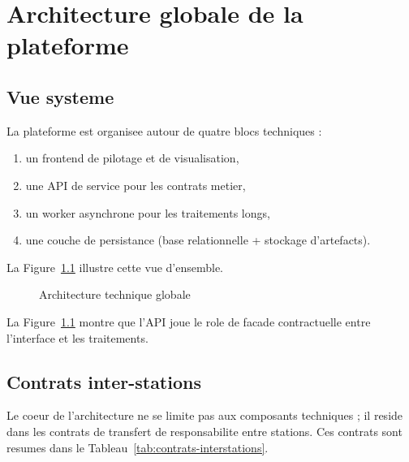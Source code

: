\chapter{Architecture globale de la plateforme}

\section{Vue systeme}
La plateforme est organisee autour de quatre blocs techniques :
\begin{enumerate}
\item un frontend de pilotage et de visualisation,
\item une API de service pour les contrats metier,
\item un worker asynchrone pour les traitements longs,
\item une couche de persistance (base relationnelle + stockage d'artefacts).
\end{enumerate}

La Figure~\ref{fig:archi-systeme} illustre cette vue d'ensemble.

\begin{figure}[H]
\centering
{}
\caption{Architecture technique globale}
\label{fig:archi-systeme}
\end{figure}

La Figure~\ref{fig:archi-systeme} montre que l'API joue le role de facade
contractuelle entre l'interface et les traitements.

\section{Contrats inter-stations}
Le coeur de l'architecture ne se limite pas aux composants techniques ; il
reside dans les contrats de transfert de responsabilite entre stations. Ces
contrats sont resumes dans le Tableau~\ref{tab:contrats-interstations}.

